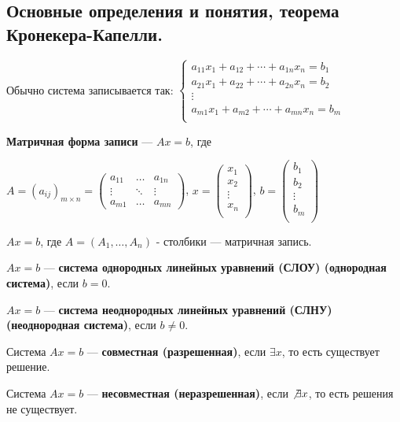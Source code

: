 \subsection{Основные определения и понятия, теорема Кронекера-Капелли.}
Обычно система записывается так:
\(\begin{cases}
    a_{11}x_1 + a_{12} + \cdots + a_{1n} x_n = b_1 \\

    a_{21}x_1 + a_{22} + \cdots + a_{2n} x_n = b_2 \\

    \vdots                                         \\

    a_{m1}x_1 + a_{m2} + \cdots + a_{mn} x_n = b_m \\
\end{cases}\)

\textbf{Матричная форма записи} --- \(Ax = b\), где

\(A = (a_{ij})_{m\times n} =
\begin{pmatrix}
    a_{11} & \ldots & a_{1n} \\
    \vdots & \ddots & \vdots \\
    a_{m1} & \ldots & a_{mn}
\end{pmatrix}\),
\(x = \begin{pmatrix}
    x_1 \\
    x_2 \\ \vdots \\ x_n \\
\end{pmatrix}\),
\(b = \begin{pmatrix}
    b_1 \\
    b_2 \\ \vdots \\ b_m \\
\end{pmatrix}\)

\(Ax = b\), где \(A = (A_1, \ldots, A_n)\) - столбики --- матричная запись.


\(Ax = b\) --- \textbf{система однородных линейных уравнений (СЛОУ) (однородная система)}, если \(b = 0\).

\(Ax = b\) --- \textbf{система неоднородных линейных уравнений (СЛНУ) (неоднородная система)}, если \(b \neq 0\).

Система \(Ax = b\) --- \textbf{совместная (разрешенная)}, если \(\exists x\), то есть существует решение.

Система \(Ax = b\) --- \textbf{несовместная (неразрешенная)}, если \(\not\exists x\), то есть решения не существует.

